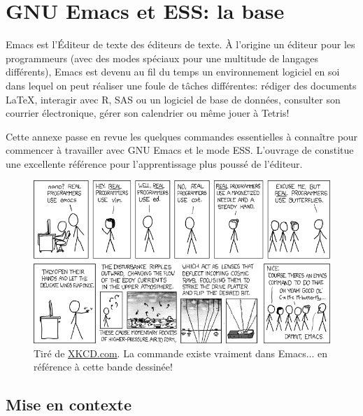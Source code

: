\chapter{GNU Emacs et ESS: la base}
\label{emacs+ess}

Emacs est l'Éditeur de texte des éditeurs de texte. À l'origine un
éditeur pour les programmeurs (avec des modes spéciaux pour une
multitude de langages différents), Emacs est devenu au fil du temps un
environnement logiciel en soi dans lequel on peut réaliser une foule
de tâches différentes: rédiger des documents {\LaTeX}, interagir avec R,
SAS ou un logiciel de base de données, consulter son courrier
électronique, gérer son calendrier ou même jouer à Tetris!

Cette annexe passe en revue les quelques commandes essentielles à
connaître pour commencer à travailler avec GNU Emacs et le mode ESS.
L'ouvrage de \cite{Cameron:Emacs:2004} constitue une excellente
référence pour l'apprentissage plus poussé de l'éditeur.

\begin{figure}[t]
  \centering
  \includegraphics{emacs.png} \\
  \footnotesize\sffamily\flushleft\vspace{-\baselineskip}%
  Tiré de \href{http://xkcd.com/378/}{XKCD.com}. La commande  existe vraiment dans Emacs... en référence à cette
  bande dessinée!
\end{figure}

\section{Mise en contexte}
\label{emacs+ess:contexte}

